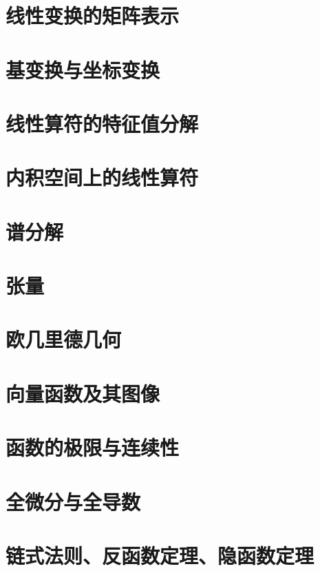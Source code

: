 \documentclass[zihao=-4,linespread=1.5,heading=true,a4paper,twoside]{ctexart}
\begin{document}
\section{线性变换的矩阵表示}\label{sec:II.5}


\section{基变换与坐标变换}\label{sec:II.6}


\section{线性算符的特征值分解}\label{sec:II.7}


\section{内积空间上的线性算符}


\section{谱分解}


\section{张量}


\section{欧几里德几何}


\section{向量函数及其图像}


\section{函数的极限与连续性}


\section{全微分与全导数}


\section{链式法则、反函数定理、隐函数定理}

\end{document}
